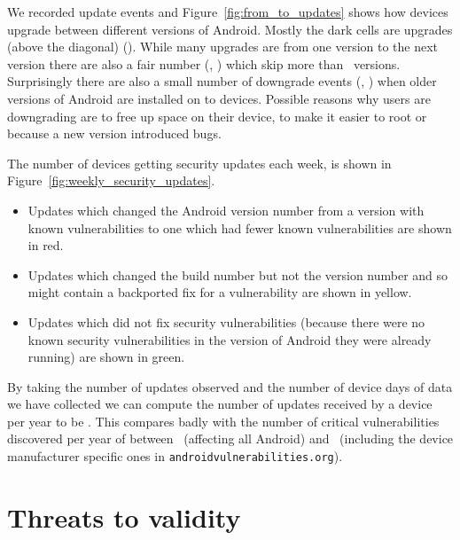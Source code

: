 \documentclass[conference,a4paper,twoside]{IEEEtran}
\newcommand{\avo}{\texttt{androidvulnerabilities.org}}
\begin{document}
We recorded update events and Figure~\ref{fig:from_to_updates} shows how devices upgrade between different versions of Android.
Mostly the dark cells are upgrades (above the diagonal) (\daNumUpdatesUpgrades).
While many upgrades are from one version to the next version there are also a fair number (\daNumUpdatesBigUpgrades, \daPercBigUpgrades) which skip more than \daNumUpdatesSkippedBig\ versions.
Surprisingly there are also a small number of downgrade events (\daNumUpdatesDowngrades, \daPercUpdatesDowngrades) when older versions of Android are installed on to devices.
Possible reasons why users are downgrading are to free up space on their device, to make it easier to root or because a new version introduced bugs.

The number of devices getting security updates each week, is shown in Figure~\ref{fig:weekly_security_updates}.
\begin{itemize}
 \item Updates which changed the Android version number from a version with known vulnerabilities to one which had fewer known vulnerabilities are shown in red.
 \item Updates which changed the build number but not the version number and so might contain a backported fix for a vulnerability are shown in yellow.
\item Updates which did not fix security vulnerabilities (because there were no known security vulnerabilities in the version of Android they were already running) are shown in green.

\end{itemize}

By taking the number of updates observed and the number of device days of data we have collected we can compute the number of updates received by a device per year to be \daUpdatesPerYear.
This compares badly with the number of critical vulnerabilities discovered per year of between \avoVulnsPerYearAllAndroid\ (affecting all Android) and \avoVulnsPerYear\ (including the device manufacturer specific ones in \avo).





\section{Threats to validity}
\label{sec:validity}
\end{document}
